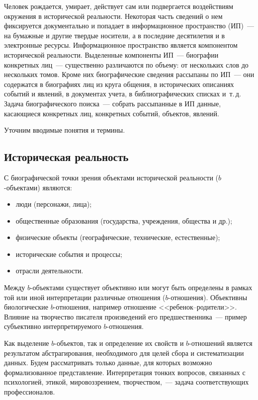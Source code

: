 \begin{multicols}{2}
  Человек рождается, умирает, действует сам или подвергается воздействиям 
окружения в исторической реальности. Некоторая часть сведений о нем 
фиксируется документально и попадает в информационное пространство 
(ИП)~--- на бумажные и другие твердые носители, а в последние десятилетия и 
в электронные ресурсы. Информационное пространство 
является компонентом исторической реальности. 
Выделенные компоненты ИП~--- биографии конкретных лиц~--- существенно 
различаются по объему: от нескольких слов до нескольких томов. Кроме них 
биографические сведения рассыпаны по ИП~--- они содержатся в биографиях 
лиц из круга общения, в исторических описаниях событий и явлений, в 
документах учета, в библиографических списках и~т.\,д. Задача 
биографического поиска~--- собрать рассыпанные в ИП данные, касающиеся 
конкретных лиц, конкретных событий, объектов, явлений.
  
  Уточним вводимые понятия и термины.

\subsection{Историческая реальность}
  
  С биографической точки зрения объектами исторической реальности 
  ($b$-объектами) являются:
  \begin{itemize}
\item люди (персонажи, лица);
\item общественные образования (государства, учреж\-де\-ния, 
общества и др.);
\item физические объекты (географические, технические, естественные);
\item исторические события и процессы; 
\item отрасли деятельности.
\end{itemize}

  Между $b$-объектами существует объективно или могут быть определены в 
рамках той или иной интерпретации различные отношения ($b$-отношения). 
Объективны биологические $b$-отношения, например отношение 
  <<ребенок--родители>>. Влияние на творчество писателя произведений его 
пред\-ше\-ст\-вен\-ни\-ка~--- пример субъективно интер\-пре\-ти\-ру\-емо\-го $b$-отношения.
  
  Как выделение $b$-объектов, так и определение их свойств и $b$-отношений 
является результатом абстрагирования, необходимого для целей сбора и 
сис\-те\-ма\-ти\-за\-ции данных. Будем рассматривать только данные, для которых 
возможно формализованное представление. Интерпретация тонких вопросов, 
связанных с психологией, этикой, мировоззрением, творчеством,~--- задача 
соответствующих профессионалов.
  

\end{multicols}
